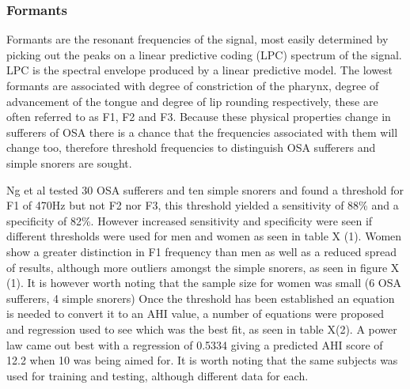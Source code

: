 \subsubsection{Formants}
Formants are the resonant frequencies of the signal, most easily determined by picking out the peaks on a linear predictive coding (LPC) spectrum of the signal. LPC is the spectral envelope produced by a linear predictive model. The lowest formants are associated with degree of constriction of the pharynx, degree of advancement of the tongue and degree of lip rounding respectively, these are often referred to as F1, F2 and F3. Because these physical properties change in sufferers of OSA there is a chance that the frequencies associated with them will change too, therefore threshold frequencies to distinguish OSA sufferers and simple snorers are sought. 

Ng et al tested 30 OSA sufferers and ten simple snorers and found a threshold for F1 of 470Hz but not F2 nor F3, this threshold yielded a sensitivity of 88\% and a specificity of 82\%. However increased sensitivity and specificity were seen if different thresholds were used for men and women as seen in table X (1). Women show a greater distinction in F1 frequency than men as well as a reduced spread of results, although more outliers amongst the simple snorers, as seen in figure X (1). It is however worth noting that the sample size for women was small (6 OSA sufferers, 4 simple snorers) Once the threshold has been established an equation is needed to convert it to an AHI value, a number of equations were proposed and regression used to see which was the best fit, as seen in table X(2). A power law came out best with a regression of 0.5334 giving a predicted AHI score of 12.2 when 10 was being aimed for. It is worth noting that the same subjects was used for training and testing, although different data for each.

